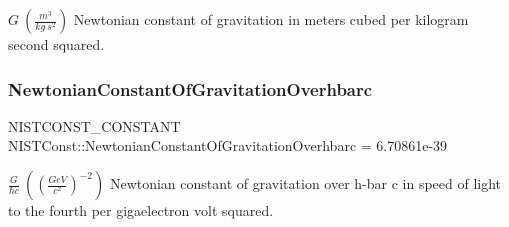 $G \ (\frac{m^3}{kg\ s^2})$ Newtonian constant of gravitation in meters cubed per kilogram second squared. \mbox{\label{group___n_i_s_t_const-_gravitational_constant_gaab8e9e8695add729258bef9e2fc7e9bf}} 
\subsubsection{\texorpdfstring{Newtonian\+Constant\+Of\+Gravitation\+Overhbarc}{NewtonianConstantOfGravitationOverhbarc}}
{\footnotesize\ttfamily N\+I\+S\+T\+C\+O\+N\+S\+T\+\_\+\+C\+O\+N\+S\+T\+A\+NT N\+I\+S\+T\+Const\+::\+Newtonian\+Constant\+Of\+Gravitation\+Overhbarc = 6.\+70861e-\/39}

$\frac{G}{\hbar c} \ ((\frac{GeV}{c^2})^{-2})$ Newtonian constant of gravitation over h-\/bar c in speed of light to the fourth per gigaelectron volt squared. 